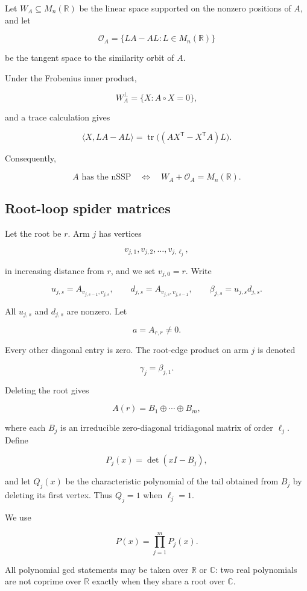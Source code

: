\documentclass[11pt]{article}
\theoremstyle{remark}
\begin{document}
Let $W_A\subseteq M_n(\mathbb R)$ be the linear space supported on the nonzero positions of $A$, and let

\[
\mathcal O_A=\{LA-AL:L\in M_n(\mathbb R)\}
\]

be the tangent space to the similarity orbit of $A$.

Under the Frobenius inner product,

\[
W_A^\perp=\{X:A\circ X=0\},
\]

and a trace calculation gives

\[
\langle X,LA-AL\rangle
=\operatorname{tr}\bigl((AX^{\mathsf T}-X^{\mathsf T}A)L\bigr).
\]

Consequently,

\[
A\text{ has the nSSP}
\quad\Longleftrightarrow\quad
W_A+\mathcal O_A=M_n(\mathbb R).
\tag{2.1}
\]

\subsection{Root-loop spider matrices}

Let the root be $r$. Arm $j$ has vertices

\[
v_{j,1},v_{j,2},\ldots,v_{j,\ell_j},
\]

in increasing distance from $r$, and we set $v_{j,0}=r$. Write

\[
u_{j,s}=A_{v_{j,s-1},v_{j,s}},
\qquad
d_{j,s}=A_{v_{j,s},v_{j,s-1}},
\qquad
\beta_{j,s}=u_{j,s}d_{j,s}.
\]

All $u_{j,s}$ and $d_{j,s}$ are nonzero. Let

\[
a=A_{r,r}\ne0.
\]

Every other diagonal entry is zero. The root-edge product on arm $j$ is denoted

\[
\gamma_j=\beta_{j,1}.
\]

Deleting the root gives

\[
A(r)=B_1\oplus\cdots\oplus B_m,
\]

where each $B_j$ is an irreducible zero-diagonal tridiagonal matrix of order $\ell_j$. Define

\[
P_j(x)=\det(xI-B_j),
\]

and let $Q_j(x)$ be the characteristic polynomial of the tail obtained from $B_j$ by deleting its first vertex. Thus $Q_j=1$ when $\ell_j=1$.

We use

\[
P(x)=\prod_{j=1}^m P_j(x).
\]

All polynomial gcd statements may be taken over $\mathbb R$ or $\mathbb C$: two real polynomials are not coprime over $\mathbb R$ exactly when they share a root over $\mathbb C$.
\end{document}
